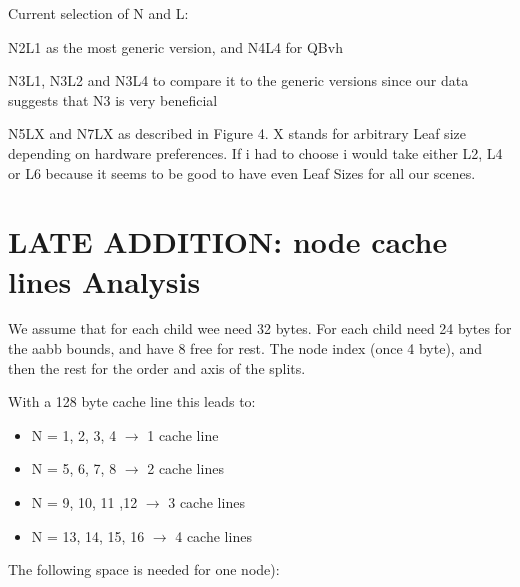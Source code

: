 \newpage

Current selection of N and L:

N2L1 as the most generic version, and N4L4 for QBvh

N3L1, N3L2 and N3L4 to compare it to the generic versions since our data suggests that N3 is very beneficial

N5LX and N7LX as described in Figure 4. X stands for arbitrary Leaf size depending on hardware preferences. If i had to choose i would take either L2, L4 or L6 because it seems to be good to have even Leaf Sizes for all our scenes.


\section{LATE ADDITION: node cache lines Analysis}

We assume that for each child wee need 32 bytes. For each child need 24 bytes for the aabb bounds, and have 8 free for rest. The node index (once 4 byte), and then the rest for the order and axis of the splits.

With a 128 byte cache line this leads to:
\begin{itemize}
	\item[] N = 1, 2, 3, 4 $\rightarrow$ 1 cache line
	\item[] N = 5, 6, 7, 8 $\rightarrow$ 2 cache lines
	\item[] N = 9, 10, 11 ,12 $\rightarrow$ 3 cache lines
	\item[] N = 13, 14, 15, 16 $\rightarrow$ 4 cache lines
\end{itemize}


\iffalse
The following space is needed for one node):

